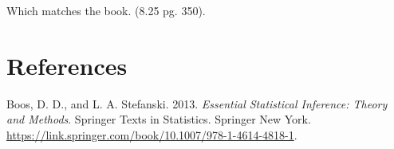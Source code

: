 \documentclass[
  letterpaper,
  DIV=11,
  numbers=noendperiod]{scrreprt}
\newlength{\cslhangindent}
\newlength{\cslentryspacingunit} %
\newenvironment{CSLReferences}[2] %
 {%
  \setlength{\parindent}{0pt}
  \ifodd #1
  \let\oldpar\par
  \def\par{\hangindent=\cslhangindent\oldpar}
  \fi
  \setlength{\parskip}{#2\cslentryspacingunit}
 }%
 {}
\begin{document}
Which matches the book. (8.25 pg. 350).


\hypertarget{references}{%
\chapter*{References}\label{references}}


\hypertarget{refs}{}
\begin{CSLReferences}{1}{0}
\leavevmode{}%
Boos, D. D., and L. A. Stefanski. 2013. \emph{Essential Statistical
Inference: Theory and Methods}. Springer Texts in Statistics. Springer
New York.
\url{https://link.springer.com/book/10.1007/978-1-4614-4818-1}.

\end{CSLReferences}
\end{document}
